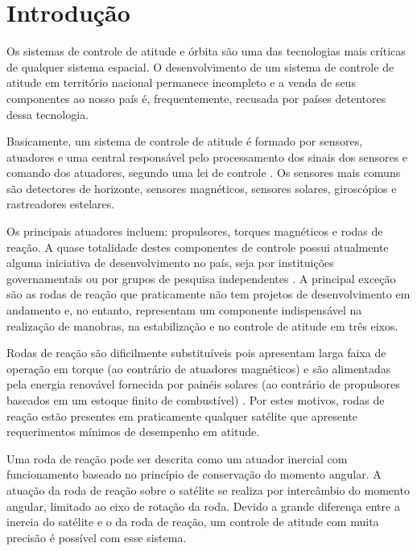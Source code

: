 \cleardoublepage

\pagestyle{fancy}


\chapter{Introdução}\label{intro}

Os sistemas de controle de atitude e órbita são uma das tecnologias mais críticas de qualquer sistema espacial. O desenvolvimento de um sistema de controle de atitude em território nacional permanece incompleto \citep{Veloso2009} e a venda de seus componentes ao nosso país é, frequentemente, recusada por países detentores dessa tecnologia.

Basicamente, um sistema de controle de atitude é formado por sensores, atuadores e uma central responsável pelo processamento dos sinais dos sensores e comando dos atuadores, segundo uma lei de controle \citep{Rycroft1992}. Os sensores mais comuns são detectores de horizonte, sensores magnéticos, sensores solares, giroscópios e rastreadores estelares. 

Os principais atuadores incluem: propulsores, torques magnéticos e rodas de reação. A quase totalidade destes componentes de controle possui atualmente alguma iniciativa de desenvolvimento no país, seja por instituições governamentais ou por grupos de pesquisa independentes \citep{PresidenciaRepublica}. A principal exceção são as rodas de reação que praticamente não tem projetos de desenvolvimento em andamento e, no entanto, representam um componente indispensável na realização de manobras, na estabilização e no controle de atitude em três eixos. 

Rodas de reação são dificilmente substituíveis pois apresentam larga faixa de operação em torque (ao contrário de atuadores magnéticos) e são alimentadas pela energia renovável fornecida por painéis solares (ao contrário de propulsores baseados em um estoque finito de combustível) \citep{Ismail2010}. Por estes motivos, rodas de reação estão presentes em praticamente qualquer satélite que apresente requerimentos mínimos de desempenho em atitude.

Uma roda de reação pode ser descrita como um atuador inercial com funcionamento baseado no princípio de conservação do momento angular. A atuação da roda de reação sobre o satélite se realiza por intercâmbio do momento angular, limitado ao eixo de rotação da roda. Devido a grande diferença entre a inercia do satélite e o da roda de reação, um controle de atitude com muita precisão é possível com esse sistema.

